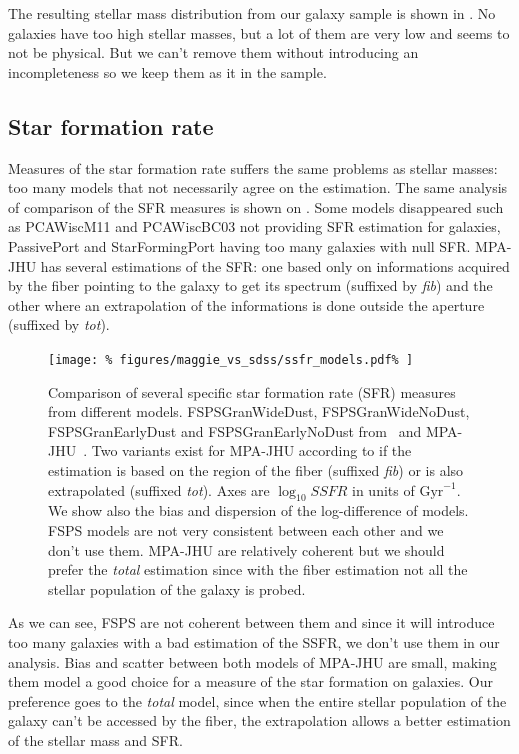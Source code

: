 The resulting stellar mass distribution from our galaxy sample is shown in
. No galaxies have too high stellar
masses, but a lot of them are very low and seems to not be physical. But we
can't remove them without introducing an incompleteness so we keep them as
it in the sample.

\subsection{Star formation rate}
\label{sub:star_formation_rate}

Measures of the star formation rate suffers the same problems as stellar
masses: too many models that not necessarily agree on the estimation. The
same analysis of comparison of the SFR measures is shown on
. Some models disappeared such as PCAWiscM11
and PCAWiscBC03 not providing SFR estimation for galaxies, PassivePort and
StarFormingPort having too many galaxies with null SFR\@. MPA-JHU has
several estimations of the SFR\@: one based only on informations acquired by
the fiber pointing to the galaxy to get its spectrum (suffixed by
\emph{fib}) and the other where an extrapolation of the informations is done
outside the aperture (suffixed by \emph{tot}).

\begin{figure}[htb]
    \centering
    \texttt{[image: \%
        figures/maggie\_vs\_sdss/ssfr\_models.pdf\%
    ]}
    \caption{Comparison of several specific star formation rate (SFR)
        measures from different models. FSPSGranWideDust,
        FSPSGranWideNoDust, FSPSGranEarlyDust and FSPSGranEarlyNoDust
        from~\cite{Conroy+09} and MPA-JHU~\cite{Brinchmann+04, Kauffmann+03,
        Tremonti+04}. Two variants exist for MPA-JHU according to if the
        estimation is based on the region of the fiber (suffixed \emph{fib})
        or is also extrapolated (suffixed \emph{tot}). Axes are $\log_{10}
        SSFR$ in units of $\mathrm{Gyr}^{-1}$. We show also the bias and
        dispersion of the log-difference of models. FSPS models are not very
        consistent between each other and we don't use them. MPA-JHU are
        relatively coherent but we should prefer the \emph{total} estimation
    since with the fiber estimation not all the stellar population of the
galaxy is probed.\label{fig:sfr_comparison}}
\end{figure}

As we can see, FSPS are not coherent between them and since it will
introduce too many galaxies with a bad estimation of the SSFR, we don't use
them in our analysis. Bias and scatter between both models of MPA-JHU are
small, making them model a good choice for a measure of the star formation
on galaxies. Our preference goes to the \emph{total} model, since when the
entire stellar population of the galaxy can't be accessed by the fiber, the
extrapolation allows a better estimation of the stellar mass and SFR\@.

